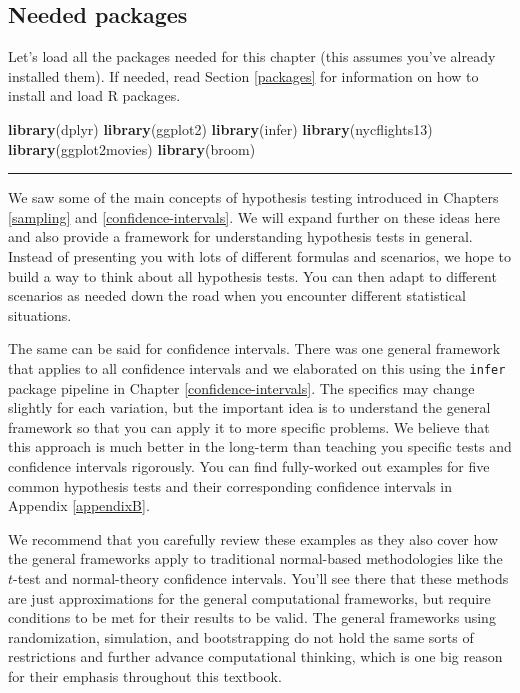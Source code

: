\documentclass[12pt, krantz2,]{krantz}
\makeatletter
\newenvironment{Shaded}{\begin{snugshade}}{\end{snugshade}}
\newcommand{\KeywordTok}[1]{\textcolor[rgb]{0.27,0.27,0.27}{\textbf{#1}}}
\newcommand{\NormalTok}[1]{#1}
\newenvironment{kframe}{%
\medskip{}
\setlength{\fboxsep}{.8em}
 \def\at@end@of@kframe{}%
 \ifinner\ifhmode%
  \def\at@end@of@kframe{\end{minipage}}%
  \begin{minipage}{\columnwidth}%
 \fi\fi%
 \def\FrameCommand##1{\hskip\@totalleftmargin \hskip-\fboxsep
 \colorbox{shadecolor}{##1}\hskip-\fboxsep
     \hskip-\linewidth \hskip-\@totalleftmargin \hskip\columnwidth}%
 \MakeFramed {\advance\hsize-\width
   \@totalleftmargin\z@ \linewidth\hsize
   \@setminipage}}%
 {\par\unskip\endMakeFramed%
 \at@end@of@kframe}
\renewenvironment{Shaded}{\begin{kframe}}{\end{kframe}}
\makeatother
\begin{document}
\hypertarget{needed-packages-7}{%
\subsection*{Needed packages}\label{needed-packages-7}}


Let's load all the packages needed for this chapter (this assumes you've already installed them). If needed, read Section \ref{packages} for information on how to install and load R packages.

\begin{Shaded}
\begin{Highlighting}[]
\KeywordTok{library}\NormalTok{(dplyr)}
\KeywordTok{library}\NormalTok{(ggplot2)}
\KeywordTok{library}\NormalTok{(infer)}
\KeywordTok{library}\NormalTok{(nycflights13)}
\KeywordTok{library}\NormalTok{(ggplot2movies)}
\KeywordTok{library}\NormalTok{(broom)}
\end{Highlighting}
\end{Shaded}

\begin{center}\rule{0.5\linewidth}{\linethickness}\end{center}

We saw some of the main concepts of hypothesis testing introduced in Chapters \ref{sampling} and \ref{confidence-intervals}. We will expand further on these ideas here and also provide a framework for understanding hypothesis tests in general. Instead of presenting you with lots of different formulas and scenarios, we hope to build a way to think about all hypothesis tests. You can then adapt to different scenarios as needed down the road when you encounter different statistical situations.

The same can be said for confidence intervals. There was one general framework that applies to all confidence intervals and we elaborated on this using the \texttt{infer} package pipeline in Chapter \ref{confidence-intervals}. The specifics may change slightly for each variation, but the important idea is to understand the general framework so that you can apply it to more specific problems. We believe that this approach is much better in the long-term than teaching you specific tests and confidence intervals rigorously. You can find fully-worked out examples for five common hypothesis tests and their corresponding confidence intervals in Appendix \ref{appendixB}.

We recommend that you carefully review these examples as they also cover how the general frameworks apply to traditional normal-based methodologies like the \(t\)-test and normal-theory confidence intervals. You'll see there that these methods are just approximations for the general computational frameworks, but require conditions to be met for their results to be valid. The general frameworks using randomization, simulation, and bootstrapping do not hold the same sorts of restrictions and further advance computational thinking, which is one big reason for their emphasis throughout this textbook.
\end{document}

